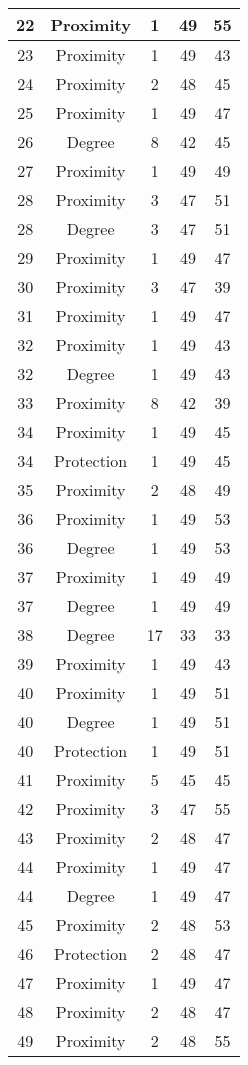 \documentclass[results.tex]{subfiles}
\begin{document}
\begin{center}
\begin{tabular}{| c || c | c | c | c |}
    \hline
    22 & Proximity & 1 & 49 & 55 \\ 
    \hline
    23 & Proximity & 1 & 49 & 43 \\ 
    \hline
    24 & Proximity & 2 & 48 & 45 \\ 
    \hline
    25 & Proximity & 1 & 49 & 47 \\ 
    \hline
    26 & Degree & 8 & 42 & 45 \\ 
    \hline
    27 & Proximity & 1 & 49 & 49 \\ 
    \hline
    28 & Proximity & 3 & 47 & 51 \\ 
    \hline
    28 & Degree & 3 & 47 & 51 \\ 
    \hline
    29 & Proximity & 1 & 49 & 47 \\ 
    \hline
    30 & Proximity & 3 & 47 & 39 \\ 
    \hline
    31 & Proximity & 1 & 49 & 47 \\ 
    \hline
    32 & Proximity & 1 & 49 & 43 \\ 
    \hline
    32 & Degree & 1 & 49 & 43 \\ 
    \hline
    33 & Proximity & 8 & 42 & 39 \\ 
    \hline
    34 & Proximity & 1 & 49 & 45 \\ 
    \hline
    34 & Protection & 1 & 49 & 45 \\ 
    \hline
    35 & Proximity & 2 & 48 & 49 \\ 
    \hline
    36 & Proximity & 1 & 49 & 53 \\ 
    \hline
    36 & Degree & 1 & 49 & 53 \\ 
    \hline
    37 & Proximity & 1 & 49 & 49 \\ 
    \hline
    37 & Degree & 1 & 49 & 49 \\ 
    \hline
    38 & Degree & 17 & 33 & 33 \\ 
    \hline
    39 & Proximity & 1 & 49 & 43 \\ 
    \hline
    40 & Proximity & 1 & 49 & 51 \\ 
    \hline
    40 & Degree & 1 & 49 & 51 \\ 
    \hline
    40 & Protection & 1 & 49 & 51 \\ 
    \hline
    41 & Proximity & 5 & 45 & 45 \\ 
    \hline
    42 & Proximity & 3 & 47 & 55 \\ 
    \hline
    43 & Proximity & 2 & 48 & 47 \\ 
    \hline
    44 & Proximity & 1 & 49 & 47 \\ 
    \hline
    44 & Degree & 1 & 49 & 47 \\ 
    \hline
    45 & Proximity & 2 & 48 & 53 \\ 
    \hline
    46 & Protection & 2 & 48 & 47 \\ 
    \hline
    47 & Proximity & 1 & 49 & 47 \\ 
    \hline
    48 & Proximity & 2 & 48 & 47 \\ 
    \hline
    49 & Proximity & 2 & 48 & 55 \\ 
    \hline   \end{tabular}
\end{center}
\end{document}
